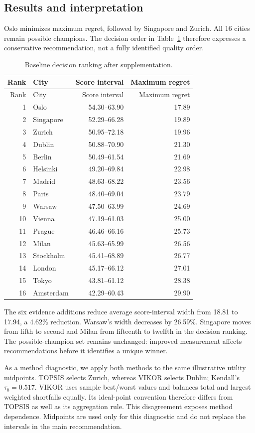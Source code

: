 \documentclass[11pt]{article}
\begin{document}
\subsection{Results and interpretation}
Oslo minimizes maximum regret, followed by Singapore and Zurich. All 16 cities remain possible champions. The decision order in Table~\ref{tab:rank} therefore expresses a conservative recommendation, not a fully identified quality order.
\begin{longtable}{rlrr}
\caption{Baseline decision ranking after supplementation.}\label{tab:rank}\\
\toprule Rank & City & Score interval & Maximum regret\\\midrule
\endfirsthead
\toprule Rank & City & Score interval & Maximum regret\\\midrule\endhead
1 & Oslo & 54.30--63.90 & 17.89 \\
2 & Singapore & 52.29--66.28 & 19.89 \\
3 & Zurich & 50.95--72.18 & 19.96 \\
4 & Dublin & 50.88--70.90 & 21.30 \\
5 & Berlin & 50.49--61.54 & 21.69 \\
6 & Helsinki & 49.20--69.84 & 22.98 \\
7 & Madrid & 48.63--68.22 & 23.56 \\
8 & Paris & 48.40--69.04 & 23.79 \\
9 & Warsaw & 47.50--63.99 & 24.69 \\
10 & Vienna & 47.19--61.03 & 25.00 \\
11 & Prague & 46.46--66.16 & 25.73 \\
12 & Milan & 45.63--65.99 & 26.56 \\
13 & Stockholm & 45.41--68.89 & 26.77 \\
14 & London & 45.17--66.12 & 27.01 \\
15 & Tokyo & 43.81--61.12 & 28.38 \\
16 & Amsterdam & 42.29--60.43 & 29.90 \\
\bottomrule
\end{longtable}
The six evidence additions reduce average score-interval width from 18.81 to 17.94, a 4.62\% reduction. Warsaw's width decreases by 26.59\%. Singapore moves from fifth to second and Milan from fifteenth to twelfth in the decision ranking. The possible-champion set remains unchanged: improved measurement affects recommendations before it identifies a unique winner.

As a method diagnostic, we apply both methods to the same illustrative utility midpoints. TOPSIS selects Zurich, whereas VIKOR selects Dublin; Kendall's $\tau_b=0.517$. VIKOR uses sample best/worst values and balances total and largest weighted shortfalls equally. Its ideal-point convention therefore differs from TOPSIS as well as its aggregation rule. This disagreement exposes method dependence. Midpoints are used only for this diagnostic and do not replace the intervals in the main recommendation.
\end{document}
